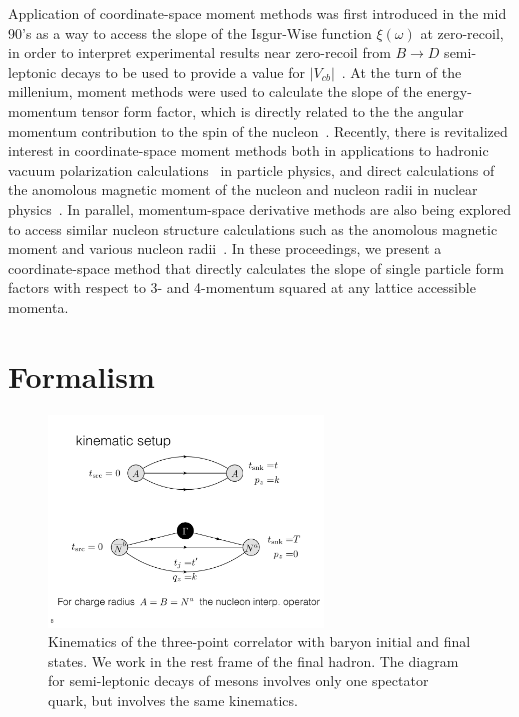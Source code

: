 \documentclass{PoS}
\begin{document}
Application of coordinate-space moment methods was first introduced in the mid 90's as a way to access the slope of the Isgur-Wise function $\xi(\omega)$ at zero-recoil, in order to interpret experimental results near zero-recoil from $B\rightarrow D$ semi-leptonic decays to be used to provide a value for $|V_{cb}|$~\cite{Lellouch:1994zu}. At the turn of the millenium, moment methods were used to calculate the slope of the energy-momentum tensor form factor, which is directly related to the the angular momentum contribution to the spin of the nucleon~\cite{Mathur:1999uf}\cite{Gadiyak:2001fe}. Recently, there is revitalized interest in coordinate-space moment methods both in applications to hadronic vacuum polarization calculations~\cite{Chakraborty:2016mwy}\cite{Blum:2016xpd} in particle physics, and direct calculations of the anomolous magnetic moment of the nucleon and nucleon radii in nuclear physics~\cite{Alexandrou:2016rbj}. In parallel, momentum-space derivative methods are also being explored to access similar nucleon structure calculations such as the anomolous magnetic moment and various nucleon radii~\cite{deDivitiis:2012vs}\cite{Tiburzi:2014yra}.  In these proceedings, we present a coordinate-space method that directly calculates the slope of single particle form factors with respect to 3- and 4-momentum squared at any lattice accessible momenta.

\section{Formalism}
\begin{figure}[h]
	\centering
		\includegraphics[width=0.65\textwidth]{./cropped_kinematics.pdf}
	\caption{Kinematics of the three-point correlator with baryon initial and final states. We work in the rest frame of the final hadron. The diagram for semi-leptonic decays of mesons involves only one spectator quark, but involves the same kinematics.}
	\label{fig:3pt_kinematics}
\end{figure}
\end{document}
